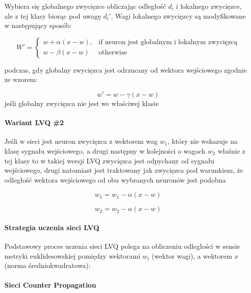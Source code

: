 Wybiera się globalnego zwycięzce obliczając odległość $d_i$ i lokalnego zwycięzce, ale z tej klasy
biorąc pod uwagę $d_i'$. Wagi lokalnego zwycięzcy są modyfikowane w następujący sposób:

\begin{equation}
 W' = \begin{cases}
    w + \alpha (x-w),& \text{if neuron jest globalnym i lokalnym zwycięzcą} \\
    w - \beta (x-w) & \text{otherwise} 
\end{cases}
\end{equation}

podczas, gdy globalny zwycięzca jest odrzucany od wektora wejściowego zgodnie ze wzorem:

\begin{equation}
 w' = w - \gamma (x - w)
\end{equation}
jeśli globalny zwycięzca nie jest we właściwej klasie

\paragraph{Wariant LVQ \#2}

Jeśli w sieci jest neuron zwycięzca z wektorem wag $w_1$, który nie wskazuje na klasę sygnału
wejściowego, a drugi następny w kolejności o wagach $w_2$ właśnie z tej klasy to w takiej wersji
LVQ zwycięzca jest odpychany od sygnału wejściowego, drugi natomiast jest traktowany jak zwycięzca 
pod warunkiem, że odległość wektora wejściowego od obu wybranych neuronów jest podobna

\begin{equation}
 w_1 = w_1 - \alpha (x - w)
\end{equation}

\begin{equation}
 w_2 = w_2 - \alpha (x - w)
\end{equation}

\paragraph{Strategia uczenia sieci LVQ}

Podstawowy proces uczenia sieci LVQ polega na obliczeniu odległości w sensie metryki euklidesowskiej
pomiędzy wektorami $w_i$ (wektor wagi), a wektorem $x$ (norma średniokwadratowa):

\paragraph{Sieci Counter Propagation}

